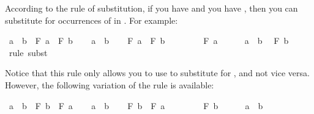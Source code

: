 \begin{isabellebody}
\begin{isamarkuptext}
According to the rule of substitution, if you have   and you have ,
then you can substitute  for occurrences of  in . For example:%
\end{isamarkuptext}\isamarkuptrue%
\isamarkupfalse%
\ {\isachardoublequoteopen}a\ {\isacharequal}\ b\ {\isasymlongrightarrow}\ F\ a\ {\isasymlongrightarrow}\ F\ b{\isachardoublequoteclose}\isanewline
%
\isadelimproof
%
\endisadelimproof
%
\isatagproof
{}\isamarkupfalse%
\isanewline
\ \ \isamarkupfalse%
\ {\isachardoublequoteopen}a\ {\isacharequal}\ b{\isachardoublequoteclose}\isanewline
\ \ \isamarkupfalse%
\ {\isachardoublequoteopen}F\ a\ {\isasymlongrightarrow}\ F\ b{\isachardoublequoteclose}\isanewline
\ \ \isamarkupfalse%
\isanewline
\ \ \ \ \isamarkupfalse%
\ {\isachardoublequoteopen}F\ a{\isachardoublequoteclose}\isanewline
\ \ \ \ \isamarkupfalse%
\ {\isacharbackquoteopen}a\ {\isacharequal}\ b{\isacharbackquoteclose}\ \isamarkupfalse%
\ {\isachardoublequoteopen}F\ b{\isachardoublequoteclose}\ \isamarkupfalse%
\ {\isacharparenleft}rule\ subst{\isacharparenright}\isanewline
\ \ \isamarkupfalse%
\isanewline
{}\isamarkupfalse%
%
\endisatagproof
{\isafoldproof}%
%
\isadelimproof
%
\endisadelimproof
%
\begin{isamarkuptext}%
Notice that this rule only allows you to use  to substitute  for
, and not vice versa. However, the following variation of the rule is available:%
\end{isamarkuptext}\isamarkuptrue%
\isamarkupfalse%
\ {\isachardoublequoteopen}a\ {\isacharequal}\ b\ {\isasymlongrightarrow}\ F\ b\ {\isasymlongrightarrow}\ F\ a{\isachardoublequoteclose}\isanewline
%
\isadelimproof
%
\endisadelimproof
%
\isatagproof
{}\isamarkupfalse%
\isanewline
\ \ \isamarkupfalse%
\ {\isachardoublequoteopen}a\ {\isacharequal}\ b{\isachardoublequoteclose}\isanewline
\ \ \isamarkupfalse%
\ {\isachardoublequoteopen}F\ b\ {\isasymlongrightarrow}\ F\ a{\isachardoublequoteclose}\isanewline
\ \ \isamarkupfalse%
\isanewline
\ \ \ \ \isamarkupfalse%
\ {\isachardoublequoteopen}F\ b{\isachardoublequoteclose}\isanewline
\ \ \ \ \isamarkupfalse%
\ {\isacharbackquoteopen}a\ {\isacharequal}\ b{\isacharbackquoteclose}\ \isamarkupfalse%

\end{isabellebody}
